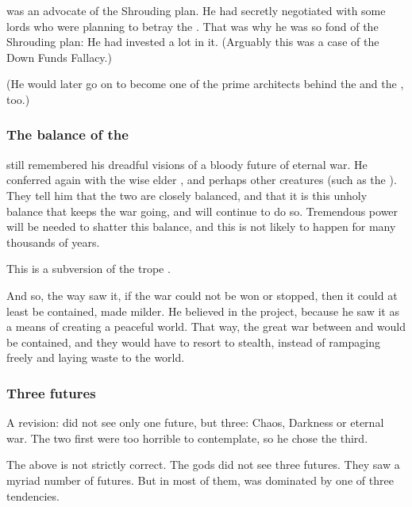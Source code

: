 \Ishnaruchaefir{} was an advocate of the Shrouding plan. 
He had secretly negotiated with some \resphan{} lords who were planning to betray the \banes. 
That was why he was so fond of the Shrouding plan: 
He had invested a lot in it. 
(Arguably this was a case of the Down Funds Fallacy.)

(He would later go on to become one of the prime architects behind the  and the , too.) 





\subsubsection{The balance of the \matrices}
\Ishnaruchaefir{} still remembered his dreadful visions of a bloody future of eternal war. He conferred again with the wise elder \ophidians, \nagae{} and perhaps other creatures (such as the ). 
They tell him that the two \matrices{} are closely balanced, and that it is this unholy balance that keeps the war going, and will continue to do so. 
Tremendous \vertex{} power will be needed to shatter this balance, and this is not likely to happen for many thousands of years. 

This is a subversion of the trope .

And so, the way \Ishnaruchaefir{} saw it, if the war could not be won or stopped, then it could at least be contained, made milder. He believed in the \charade{} project, because he saw it as a means of creating a peaceful world. That way, the great war between \dragons{} and \banes{} would be contained, and they would have to resort to stealth, instead of rampaging freely and laying waste to the world. 





\subsubsection{Three futures}
A revision: 
\Ishnaruchaefir{} did not see only one future, but three: 
Chaos, Darkness or eternal war. 
The two first were too horrible to contemplate, so he chose the third. 

The above is not strictly correct. 
The gods did not see three futures. 
They saw a myriad number of futures. 
But in most of them, \Miith{} was dominated by one of three tendencies. 

